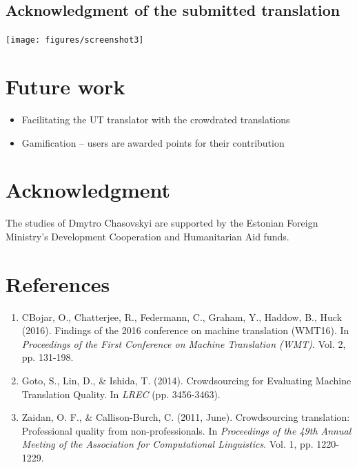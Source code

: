 \documentclass[a0,portrait]{a0poster}
\begin{document}
\begin{multicols}{2}
\subsection*{Acknowledgment of the submitted translation}
\begin{center}\vspace{1cm}
	\texttt{[image: figures/screenshot3]}
\end{center}\vspace{1cm}


\section*{Future work}

\begin{itemize}
	\item Facilitating the UT translator with the crowdrated translations
\item Gamification -- users are awarded points for their contribution
\end{itemize}

\section*{Acknowledgment}
The studies of Dmytro Chasovskyi are supported by the Estonian Foreign Ministry's Development Cooperation and Humanitarian Aid funds.

\section*{References}

\begin{enumerate}
\item CBojar, O., Chatterjee, R., Federmann, C., Graham, Y., Haddow, B., Huck (2016). Findings of the 2016 conference on machine translation (WMT16). In \emph{Proceedings of the First Conference on Machine Translation (WMT)}. Vol. 2, pp. 131-198.
\item Goto, S., Lin, D., \& Ishida, T. (2014). Crowdsourcing for Evaluating Machine Translation Quality. In \emph{LREC} (pp. 3456-3463).
\item Zaidan, O. F., \& Callison-Burch, C. (2011, June). Crowdsourcing translation: Professional quality from non-professionals. In \emph{Proceedings of the 49th Annual Meeting of the Association for Computational Linguistics}. Vol. 1, pp. 1220-1229.
\end{enumerate}




\end{multicols}
\end{document}
